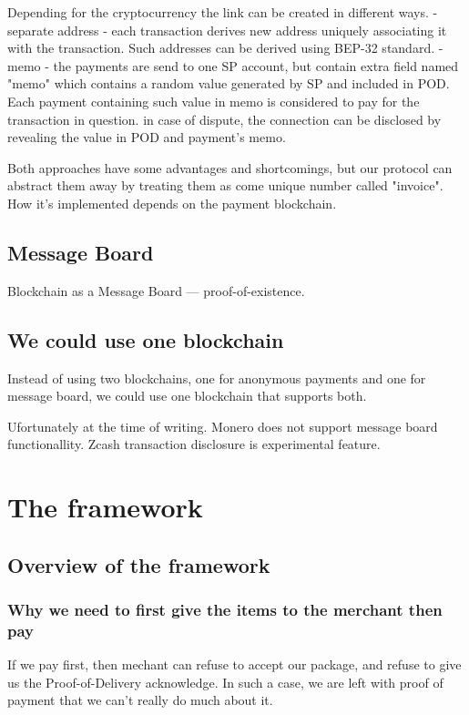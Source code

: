 \documentclass{article}
\begin{document}
Depending for the cryptocurrency the link can be created in different ways. 
- separate address - each transaction derives new address uniquely associating it with the transaction. Such addresses can be derived using BEP-32 standard. 
- memo - the payments are send to one SP account, but contain extra field named "memo" which contains a random value generated by SP and included in POD. Each payment containing such value in memo is considered to pay for the transaction in question. in case of dispute, the connection can be disclosed by revealing the value in POD and  payment's memo. 


Both approaches have some advantages and shortcomings, but our protocol can abstract them away by treating them as come unique number called "invoice". How it's implemented  depends on the payment blockchain. 

\subsection{Message Board}
Blockchain as a Message Board — proof-of-existence.

\subsection{We could use one blockchain}
Instead of using two blockchains, one for anonymous payments and one for message board, we could use one blockchain that supports both.

Ufortunately at the time of writing. Monero does not support message board functionallity. Zcash transaction disclosure is experimental feature.


\section{The framework}

\subsection{Overview of the framework}
\subsubsection{Why we need to first give the items to the merchant then pay}

If we pay first, then mechant can refuse to accept our package, and refuse to give us the Proof-of-Delivery acknowledge. In such a case, we are left with proof of payment that we can't really do much about it.
\end{document}
